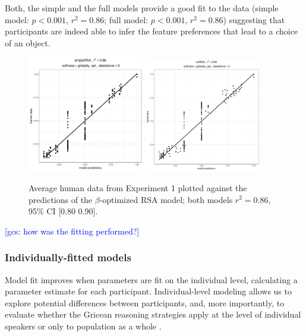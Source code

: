 \documentclass[10pt,a4paper]{article}
\newcommand{\gcs}[1]{\textcolor{blue}{[gcs: #1]}}
\begin{document}
Both, the simple and the full models provide a good fit to the data (simple model: $p < 0.001$, $r^2 = 0.86$; full model: $p < 0.001$, $r^2 = 0.86$) suggesting that participants are indeed able to infer the feature preferences that lead to a choice of an object. %

\begin{figure}[ht]
	\centering
	\includegraphics[width=2in]{images/m13.pdf}
	\includegraphics[width=2in]{images/m23.pdf}
	\caption{Average human data from Experiment 1 plotted against the predictions of the $\beta$-optimized RSA model; both models $r^{2}=0.86$, 95\% CI [0.80 0.90].}\label{simple-full}
\end{figure}

\gcs{how was the fitting performed?}

\subsubsection{Individually-fitted models}

Model fit improves when parameters are fit on the individual level, calculating a parameter estimate for each participant. Individual-level modeling allows us to explore potential differences between participants, and, more importantly, to evaluate whether the Gricean reasoning strategies apply at the level of individual speakers or only to population as a whole \cite{franke2016reasoning}. 
\end{document}
